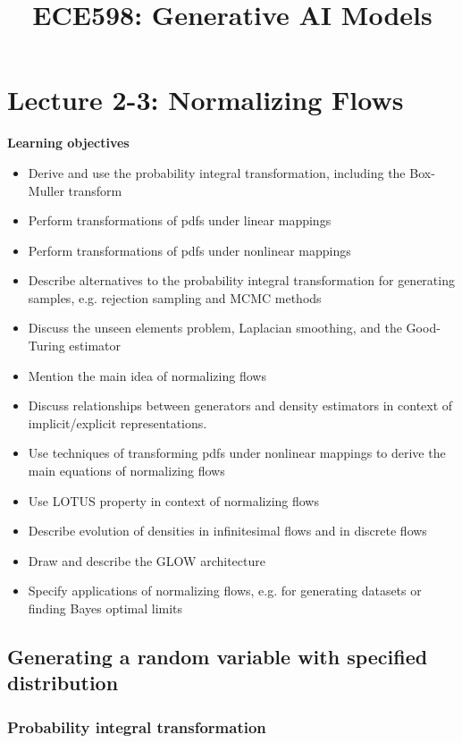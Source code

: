 \documentclass[12pt,a4paper]{article}
\title{ECE598: Generative AI Models}
\begin{document}
\maketitle

\section{Lecture 2-3: Normalizing Flows}
\textbf{Learning objectives}

\begin{itemize}
\item Derive and use the probability integral transformation, including the Box-Muller transform
\item Perform transformations of pdfs under linear mappings
\item Perform transformations of pdfs under nonlinear mappings
\item Describe alternatives to the probability integral transformation for generating samples, e.g. rejection sampling and MCMC methods
\item Discuss the unseen elements problem, Laplacian smoothing, and the Good-Turing estimator
\item Mention the main idea of normalizing flows
\item Discuss relationships between generators and density estimators in context of implicit/explicit representations.
\item Use techniques of transforming pdfs under nonlinear mappings to derive the main equations of normalizing flows
\item Use LOTUS property in context of normalizing flows
\item Describe evolution of densities in infinitesimal flows and in discrete flows
\item Draw and describe the GLOW architecture
\item Specify applications of normalizing flows, e.g. for generating datasets or finding Bayes optimal limits
\end{itemize}

\subsection{Generating a random variable with specified distribution}
\subsubsection{Probability integral transformation}
\end{document}

